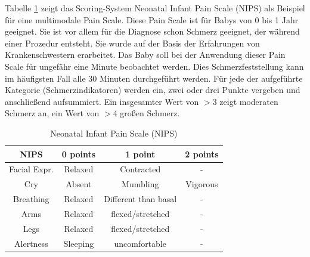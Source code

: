 Tabelle \ref{tab:nips} zeigt das Scoring-System \glqq Neonatal Infant Pain Scale\grqq{} (NIPS) als Beispiel für eine multimodale Pain Scale. Diese Pain Scale ist für Babys von 0 bis 1 Jahr geeignet. Sie ist vor allem für die Diagnose schon Schmerz geeignet, der während einer Prozedur entsteht. Sie wurde auf der Basis der Erfahrungen von Krankenschwestern erarbeitet. Das Baby soll bei der Anwendung dieser Pain Scale für ungefähr eine Minute beobachtet werden. Dies Schmerzfeststellung kann im häufigsten Fall alle 30 Minuten durchgeführt werden. Für jede der aufgeführte Kategorie (Schmerzindikatoren) werden ein, zwei oder drei Punkte vergeben und anschließend aufsummiert. Ein insgesamter Wert von $>3$ zeigt moderaten Schmerz an, ein Wert von $>4$ großen Schmerz.\cite{nips} \cite[S. 98]{painInNeonates}

\begin{table}[h]
	\footnotesize
	\centering
	\caption{Neonatal Infant Pain Scale (NIPS) \cite{nips}}
	\label{tab:nips}
	\begin{tabular}{@{}cccc@{}}
		\toprule
		\textbf{NIPS}     & \textbf{0 points} & \textbf{1 point}     & \textbf{2 points} \\ \midrule
		Facial Expr. & Relaxed           & Contracted           & -                 \\
		Cry               & Absent            & Mumbling             & Vigorous          \\
		Breathing         & Relaxed           & Different than basal & -                 \\
		Arms              & Relaxed           & flexed/stretched     & -                 \\
		Legs              & Relaxed           & flexed/stretched     & -                 \\
		Alertness         & Sleeping          & uncomfortable        & -                 \\ \bottomrule
	\end{tabular}
\end{table}


